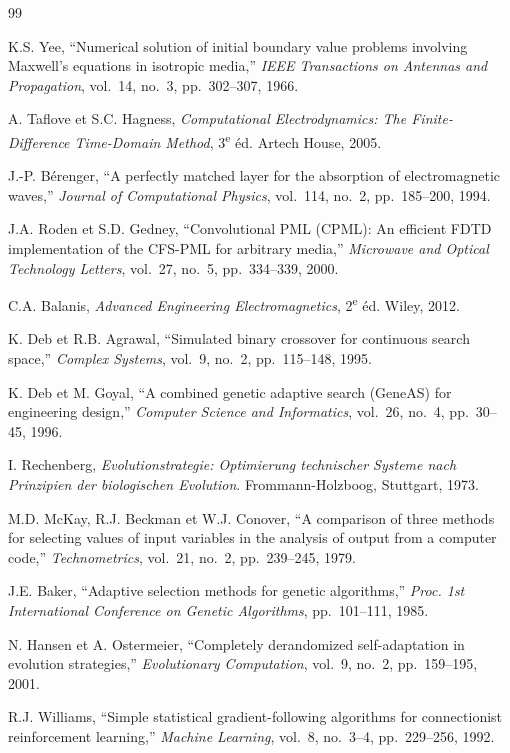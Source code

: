 \documentclass[12pt,a4paper]{article}
\numberwithin{equation}{section}
\numberwithin{figure}{section}
\numberwithin{table}{section}
\begin{document}
\begin{thebibliography}{99}

K.S. Yee, ``Numerical solution of initial boundary value problems involving
Maxwell's equations in isotropic media,''
\textit{IEEE Transactions on Antennas and Propagation}, vol.~14, no.~3,
pp.~302--307, 1966.

A. Taflove et S.C. Hagness,
\textit{Computational Electrodynamics: The Finite-Difference Time-Domain Method},
3\textsuperscript{e} éd. Artech House, 2005.

J.-P. Bérenger, ``A perfectly matched layer for the absorption of
electromagnetic waves,''
\textit{Journal of Computational Physics}, vol.~114, no.~2, pp.~185--200, 1994.

J.A. Roden et S.D. Gedney, ``Convolutional PML (CPML): An efficient FDTD
implementation of the CFS-PML for arbitrary media,''
\textit{Microwave and Optical Technology Letters}, vol.~27, no.~5,
pp.~334--339, 2000.

C.A. Balanis,
\textit{Advanced Engineering Electromagnetics}, 2\textsuperscript{e} éd.
Wiley, 2012.

K. Deb et R.B. Agrawal, ``Simulated binary crossover for continuous search
space,'' \textit{Complex Systems}, vol.~9, no.~2, pp.~115--148, 1995.

K. Deb et M. Goyal, ``A combined genetic adaptive search (GeneAS) for
engineering design,'' \textit{Computer Science and Informatics}, vol.~26,
no.~4, pp.~30--45, 1996.

I. Rechenberg,
\textit{Evolutionstrategie: Optimierung technischer Systeme nach Prinzipien
der biologischen Evolution}. Frommann-Holzboog, Stuttgart, 1973.

M.D. McKay, R.J. Beckman et W.J. Conover, ``A comparison of three methods for
selecting values of input variables in the analysis of output from a computer
code,'' \textit{Technometrics}, vol.~21, no.~2, pp.~239--245, 1979.

J.E. Baker, ``Adaptive selection methods for genetic algorithms,''
\textit{Proc. 1st International Conference on Genetic Algorithms}, pp.~101--111,
1985.

N. Hansen et A. Ostermeier, ``Completely derandomized self-adaptation in
evolution strategies,'' \textit{Evolutionary Computation}, vol.~9, no.~2,
pp.~159--195, 2001.

R.J. Williams, ``Simple statistical gradient-following algorithms for
connectionist reinforcement learning,'' \textit{Machine Learning}, vol.~8,
no.~3--4, pp.~229--256, 1992.

\end{thebibliography}
\end{document}
